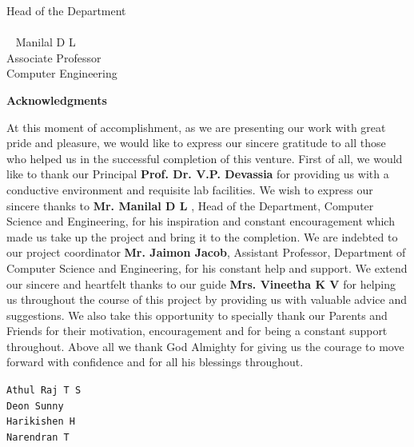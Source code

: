 \documentclass[11pt]{report}
\begin{document}
\begin{titlepage}
\begin{tabbing}
			\>Head of the Department \\

\\
\  %
\> Manilal D L\\
\> Associate Professor\\
\> Computer  Engineering\\
\end{tabbing}
\end{titlepage}
  
 

\begin{titlepage}
\vspace{.25in}	
\begin{center}
\Large\textbf{{Acknowledgments}}\\
\end{center}
\normalsize
\vspace{.25in}

\vspace{.25in}
At this moment of accomplishment, as we are presenting our work with great pride and pleasure,
we would like to express our sincere gratitude to all those who helped us in the successful completion
of this venture. First of all, we would like to thank our Principal \textbf{Prof. Dr. V.P. Devassia} for
providing us with a conductive environment and requisite lab facilities. We wish to express our
sincere thanks to \textbf{Mr. Manilal D L} , Head of the Department, Computer Science and
Engineering, for his inspiration and constant encouragement which made us take up the project
and bring it to the completion. We are indebted to our project coordinator \textbf{Mr. Jaimon Jacob},
Assistant Professor, Department of Computer Science and Engineering, for his constant help and
support. We extend our sincere and heartfelt thanks to our guide \textbf{Mrs. Vineetha K V} for helping
us throughout the course of this project by providing us with valuable advice and suggestions.
We also take this opportunity to specially thank our Parents and Friends for their motivation,
encouragement and for being a constant support throughout. Above all we thank God Almighty
for giving us the courage to move forward with confidence and for all his blessings throughout.

\begin{flushleft}
\small{\texttt{Athul Raj T S}}\\
\small{\texttt{Deon Sunny}}\\
\small{\texttt{Harikishen H}}\\
\small{\texttt{Narendran T}}
\end{flushleft}
 
\end{titlepage}
\end{document}
